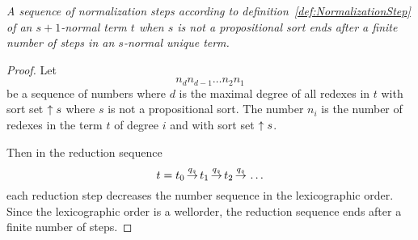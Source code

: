 \begin{theorem}
    \emph{A sequence of normalization steps
        according to
        definition~\ref{def:NormalizationStep}
        of an $s+1$-normal term $t$
        when $s$
        is not a propositional sort
        ends after a finite number of steps
        in an $s$-normal unique term.}

    \begin{proof}

        Let
        $$
            n_d n_{d-1} \ldots n_2 n_1
        $$
        be a sequence of numbers where $d$ is the maximal degree of all redexes
        in $t$ with sort set ${\uparrow s}$ where $s$ is not a propositional sort.
        The number $n_i$ is the number of redexes in the term $t$ of degree $i$
        and with sort set ${\uparrow s}$.

        Then in the reduction sequence
        $$
            t = t_0 {\,\stackrel{q_s}{\to}\,} t_1 {\,\stackrel{q_s}{\to}\,} t_2 {\,\stackrel{q_s}{\to}\,} \ldots
        $$
        each reduction step decreases the number sequence in the lexicographic
        order. Since the lexicographic order is a wellorder, the reduction
        sequence ends after a finite number of steps.
    \end{proof}
\end{theorem}
